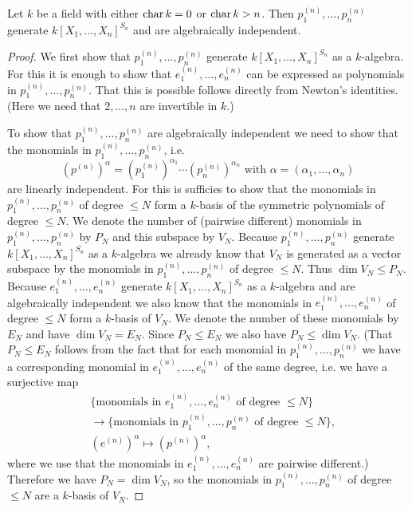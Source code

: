 \begin{thrm}
 Let $k$ be a field with either $\operatorname{char} k = 0$ or $\operatorname{char} k > n$. Then $p^{(n)}_1, \ldots, p^{(n)}_n$ generate $k[X_1, \ldots, X_n]^{S_n}$ and are algebraically independent.
\end{thrm}
\begin{proof}
 We first show that $p^{(n)}_1, \ldots, p^{(n)}_n$ generate $k[X_1, \ldots, X_n]^{S_n}$ as a $k$-algebra. For this it is enough to show that $e^{(n)}_1, \ldots, e^{(n)}_n$ can be expressed as polynomials in $p^{(n)}_1, \ldots, p^{(n)}_n$. That this is possible follows directly from Newton’s identities. (Here we need that $2, \ldots, n$ are invertible in $k$.)
 
 To show that $p^{(n)}_1, \ldots, p^{(n)}_n$ are algebraically independent we need to show that the monomials in $p^{(n)}_1, \ldots, p^{(n)}_n$, i.e.
 \[
  \left(p^{(n)}\right)^\alpha = \left(p^{(n)}_1\right)^{\alpha_1} \cdots \left(p^{(n)}_n\right)^{\alpha_n} \text{ with } \alpha = (\alpha_1, \ldots, \alpha_n)
 \]
 are linearly independent. For this is sufficies to show that the monomials in $p^{(n)}_1, \ldots, p^{(n)}_n$ of degree $\leq N$ form a $k$-basis of the symmetric polynomials of degree $\leq N$. We denote the number of (pairwise different) monomials in $p^{(n)}_1, \ldots, p^{(n)}_n$ by $P_N$ and this subspace by $V_N$. Because $p^{(n)}_1, \ldots, p^{(n)}_n$ generate $k[X_1, \ldots, X_n]^{S_n}$ as a $k$-algebra we already know that $V_N$ is generated as a vector subspace by the monomials in $p^{(n)}_1, \ldots, p^{(n)}_n$ of degree $\leq N$. Thus $\dim V_N \leq P_N$. Because $e^{(n)}_1, \ldots, e^{(n)}_n$ generate $k[X_1, \ldots, X_n]^{S_n}$ as a $k$-algebra and are algebraically independent we also know that the monomials in $e^{(n)}_1, \ldots, e^{(n)}_n$ of degree $\leq N$ form a $k$-basis of $V_N$. We denote the number of these monomials by $E_N$ and have $\dim V_N = E_N$. Since $P_N \leq E_N$ we also have $P_N \leq \dim V_N$. (That $P_N \leq E_N$ follows from the fact that for each monomial in $p^{(n)}_1, \ldots, p^{(n)}_n$ we have a corresponding monomial in $e^{(n)}_1, \ldots, e^{(n)}_n$ of the same degree, i.e. we have a surjective map
\begin{align*}
    &\, \{\text{monomials in $e^{(n)}_1, \ldots, e^{(n)}_n$ of degree $\leq N$}\} \\
    &\, \to \{\text{monomials in $p^{(n)}_1, \ldots, p^{(n)}_n$ of degree $\leq N$}\}, \\
    &\, \left(e^{(n)}\right)^\alpha \mapsto \left(p^{(n)}\right)^\alpha,
\end{align*}
where we use that the monomials in $e^{(n)}_1, \ldots, e^{(n)}_n$ are pairwise different.)
Therefore we have $P_N = \dim V_N$, so the monomials in $p^{(n)}_1, \ldots, p^{(n)}_n$ of degree $\leq N$ are a $k$-basis of $V_N$.
\end{proof}


